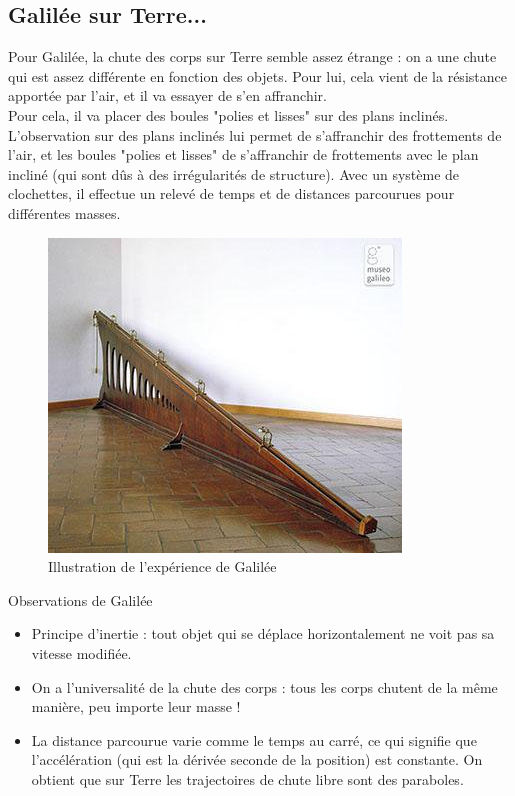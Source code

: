 \documentclass{classe}
\begin{document}
\subsection{Galilée sur Terre...}

Pour Galilée, la chute des corps sur Terre semble assez étrange : on a une chute qui est assez différente en fonction des objets. Pour lui, cela vient de la résistance apportée par l'air, et il va essayer de s'en affranchir.\\

Pour cela, il va placer des boules "polies et lisses" sur des plans inclinés. L'observation sur des plans inclinés lui permet de s'affranchir des frottements de l'air, et les boules "polies et lisses" de s'affranchir de frottements avec le plan incliné (qui sont dûs à des irrégularités de structure). Avec un système de clochettes, il effectue un relevé de temps et de distances parcourues pour différentes masses.

\begin{figure}[H]
\centering
\includegraphics[scale=.7]{Clochettes.jpg}
\caption{Illustration de l'expérience de Galilée}
\end{figure}

\begin{propositionfr}{Observations de Galilée}{}
\begin{itemize}
\item Principe d'inertie : tout objet qui se déplace horizontalement ne voit pas sa vitesse modifiée.
\item On a l'universalité de la chute des corps : tous les corps chutent de la même manière, peu importe leur masse !
\item La distance parcourue varie comme le temps au carré, ce qui signifie que l'accélération (qui est la dérivée seconde de la position) est constante. On obtient que sur Terre les trajectoires de chute libre sont des paraboles.
\end{itemize}
\end{propositionfr}
\end{document}
